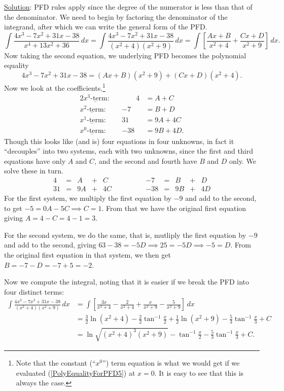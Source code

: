 \underline{Solution}:
PFD rules apply since the degree of the numerator is less than that
of the denominator.
We need to begin by factoring the denominator of the integrand,
after which we can write the general form of the PFD.
$$
\int\frac{4x^3-7x^2+31x-38}{x^4+13x^2+36}\,dx
=\int\frac{4x^3-7x^2+31x-38}{(x^2+4)(x^2+9)}\,dx
=\int\left[\frac{Ax+B}{x^2+4}+\frac{Cx+D}{x^2+9}\right]\,dx.$$
Now taking the second equation, we underlying PFD becomes
the polynomial equality
\begin{equation}4x^3-7x^2+31x-38=(Ax+B)(x^2+9)+(Cx+D)(x^2+4).
\label{PolyEqualityForPFD5}
\end{equation}
Now we look at the coefficients.\footnote{%
Note that the constant (``$x^0$'') term equation is what we 
would get if we evaluated (\ref{PolyEqualityForPFD5}) at $x=0$.
It is easy to see that this is always the case.%
}
\begin{alignat*}{2}
\underline{x^3\text{-term}}:&&\qquad 4&=A+C\\
\underline{x^2\text{-term}}:&&-7&=B+D\\
\underline{x^1\text{-term}}:&&31&=9A+4C\\
\underline{x^0\text{-term}}:&&-38&=9B+4D.
\end{alignat*}
Though this looks like (and is) four equations in four
unknowns, in fact it ``decouples'' into two systems,
each with two unknowns, since the first and third
equations have only $A$ and $C$, and the second and fourth have
$B$ and $D$ only.  We solve these in turn.
$$\begin{array}{rcrcr}
4&=&A&+&C\\
31&=&9A&+&4C\end{array}
\qquad\qquad
\begin{array}{rcrcr}
-7&=&B&+&D\\
-38&=&9B&+&4D\end{array}$$
For the first system, we multiply the first equation by $-9$ and add
to the second, to get $-5=0A-5C\implies C=1$. From that we have
the original first equation giving $A=4-C=4-1=3$.

For the second system, we do the same, that is, mutliply the first
equation by $-9$ and add to the second, giving $63-38=-5D
\implies25=-5D\implies-5=D$.  From the original first equation
in that system, we then get $B=-7-D=-7+5=-2$.

Now we compute the integral, noting that it is easier if we
break the PFD into four distinct terms:
\begin{align*}
\int\frac{4x^3-7x^2+31x-38}{(x^2+4)(x^2+9)}\,dx
&=\int\left[\frac{3x}{x^2+4}-\frac{2}{x^2+4}
              +\frac{x}{x^2+9}-\frac5{x^2+9}\right]\,dx\\
&=\frac32\ln(x^2+4)-\frac22\tan^{-1}\frac{x}2+\frac12\ln(x^2+9)
        -\frac53\tan^{-1}\frac{x}3+C\\
&=\ln\sqrt{(x^2+4)^3(x^2+9)}-\tan^{-1}\frac{x}2
         -\frac53\tan^{-1}\frac{x}3+C.
\end{align*}
\eex

